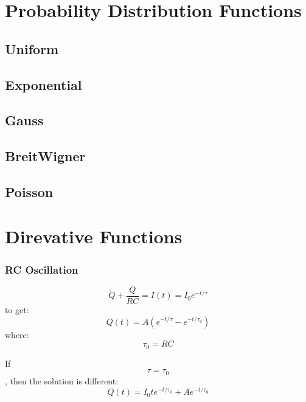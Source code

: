\section{Probability Distribution Functions}

\subsection{Uniform}

\subsection{Exponential}

\subsection{Gauss}

\subsection{BreitWigner}

\subsection{Poisson}

\section{Direvative Functions}

\subsubsection{RC Oscillation}
\begin{equation}
    \dot{Q} + \frac{Q}{RC} = I(t) = I_0e^{-t/\tau}
\end{equation}
to get:
\begin{equation}
    Q(t) = A (e^{-t/\tau} - e^{-t/\tau_0})
\end{equation}
where: $$ \tau_0 = RC $$ 

If $$ \tau = \tau_0 $$, then the solution is different:
\begin{equation}
    Q(t) = I_0 te^{-t/\tau_0} + Ae^{-t/\tau_0}
\end{equation}
